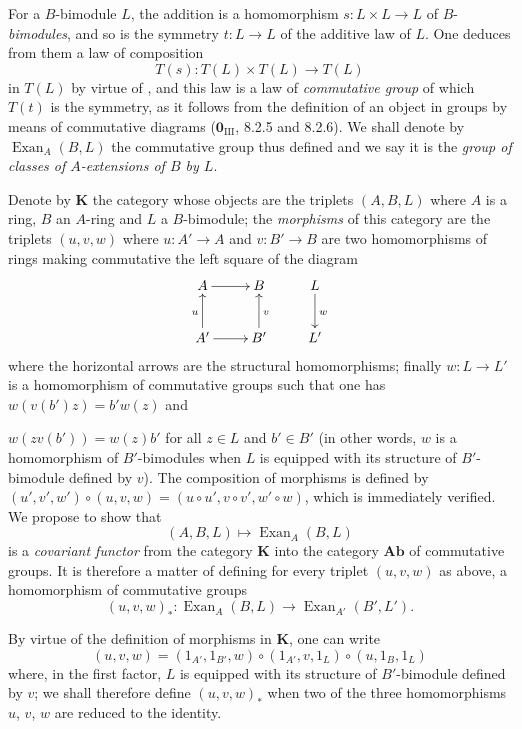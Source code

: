 \begin{env}[18.3.4]
\label{0.18.3.4}
For a $B$-bimodule $L$, the addition is a homomorphism $s:L\times L\to L$ of $B$-\emph{bimodules}, and so is the symmetry $t:L\to L$ of the additive law of $L$.
One deduces from them a law of composition
\[
  T(s):T(L)\times T(L)\to T(L)
\]
in $T(L)$ by virtue of , and this law is a law of \emph{commutative group} of which $T(t)$ is the symmetry, as it follows from the definition of an object in groups by means of commutative diagrams ($\mathbf 0_{\mathrm{III}}$, 8.2.5 and 8.2.6).
We shall denote by $\operatorname{Exan}_A(B,L)$ the commutative group thus defined and we say it is the \emph{group of classes of $A$-extensions of $B$ by $L$}.
\end{env}

\begin{env}[18.3.5]
\label{0.18.3.5}
Denote by $\boldsymbol{K}$ the category whose objects are the triplets $(A,B,L)$ where $A$ is a ring, $B$ an $A$-ring and $L$ a $B$-bimodule; the \emph{morphisms} of this category are the triplets $(u,v,w)$ where $u:A'\to A$ and $v:B'\to B$ are two homomorphisms of rings making commutative the left square of the diagram
\[
  \xymatrix{
    A\ar[r] & B & L\ar[d]^w\\
    A'\ar[u]^u\ar[r] & B'\ar[u]_v & L'
  }
\]
where the horizontal arrows are the structural homomorphisms; finally $w:L\to L'$ is a homomorphism of commutative groups such that one has $w(v(b')z)=b'w(z)$ and


$w(zv(b'))=w(z)b'$ for all $z\in L$ and $b'\in B'$ (in other words, $w$ is a homomorphism of $B'$-bimodules when $L$ is equipped with its structure of $B'$-bimodule defined by $v$).
The composition of morphisms is defined by $(u',v',w')\circ(u,v,w)=(u\circ u',v\circ v',w'\circ w)$, which is immediately verified.
We propose to show that
\begin{equation}
\tag{18.3.5.1}
  \label{0.18.3.5.1}
  (A,B,L)\mapsto\operatorname{Exan}_A(B,L)
\end{equation}
is a \emph{covariant functor} from the category $\boldsymbol{K}$ into the category $\boldsymbol{Ab}$ of commutative groups.
It is therefore a matter of defining for every triplet $(u,v,w)$ as above, a homomorphism of commutative groups
\[
  (u,v,w)_*:\operatorname{Exan}_A(B,L)\to\operatorname{Exan}_{A'}(B',L').
\]

By virtue of the definition of morphisms in $\boldsymbol{K}$, one can write
\[
  (u,v,w)=(1_{A'},1_{B'},w)\circ(1_{A'},v,1_L)\circ(u,1_B,1_L)
\]
where, in the first factor, $L$ is equipped with its structure of $B'$-bimodule defined by $v$; we shall therefore define $(u,v,w)_*$ when two of the three homomorphisms $u$, $v$, $w$ are reduced to the identity.
\end{env}

